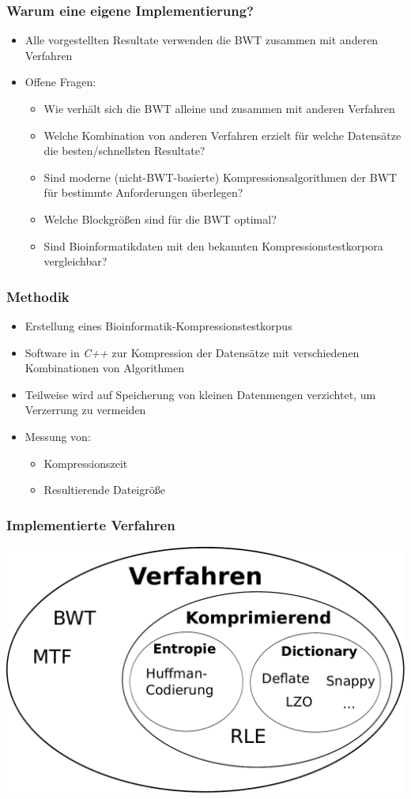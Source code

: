 \documentclass[14pt,xcolor=dvipsnames,pdftex]{beamer}
\begin{document}
\begin{frame}
 \frametitle{Warum eine eigene Implementierung?}
 \begin{itemize}
  \item Alle vorgestellten Resultate verwenden die BWT zusammen mit anderen Verfahren
  \item Offene Fragen:
  \begin{itemize}
  \item Wie verhält sich die BWT alleine und zusammen mit anderen Verfahren
  \item Welche Kombination von anderen Verfahren erzielt für welche Datensätze die besten/schnellsten Resultate?
  \item Sind moderne (nicht-BWT-basierte) Kompressionsalgorithmen der BWT für bestimmte Anforderungen überlegen?
  \item Welche Blockgrößen sind für die BWT optimal?
  \item Sind Bioinformatikdaten mit den bekannten Kompressionstestkorpora vergleichbar?
  \end{itemize}
 \end{itemize}
\end{frame}
\begin{frame}
 \frametitle{Methodik}
 \begin{itemize}
  \item Erstellung eines Bioinformatik-Kompressionstestkorpus
  \item Software in \textit{C++} zur Kompression der Datensätze mit verschiedenen Kombinationen von Algorithmen
  \item Teilweise wird auf Speicherung von kleinen Datenmengen verzichtet, um Verzerrung zu vermeiden
  \item Messung von:
  \begin{itemize}
   \item Kompressionszeit
   \item Resultierende Dateigröße
  \end{itemize}
 \end{itemize}
\end{frame}
\begin{frame}
 \frametitle{Implementierte Verfahren}
 \includegraphics[width=\textwidth]{../Algorithms-Venn.pdf}
\end{frame}
\end{document}
